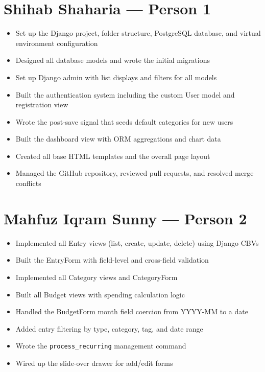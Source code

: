 \documentclass[12pt,a4paper]{report}
\begin{document}
\section{Shihab Shaharia --- Person 1}

\begin{itemize}
  \item Set up the Django project, folder structure, PostgreSQL database, and virtual environment configuration
  \item Designed all database models and wrote the initial migrations
  \item Set up Django admin with list displays and filters for all models
  \item Built the authentication system including the custom User model and registration view
  \item Wrote the post-save signal that seeds default categories for new users
  \item Built the dashboard view with ORM aggregations and chart data
  \item Created all base HTML templates and the overall page layout
  \item Managed the GitHub repository, reviewed pull requests, and resolved merge conflicts
\end{itemize}

\section{Mahfuz Iqram Sunny --- Person 2}

\begin{itemize}
  \item Implemented all Entry views (list, create, update, delete) using Django CBVs
  \item Built the EntryForm with field-level and cross-field validation
  \item Implemented all Category views and CategoryForm
  \item Built all Budget views with spending calculation logic
  \item Handled the BudgetForm month field coercion from YYYY-MM to a date
  \item Added entry filtering by type, category, tag, and date range
  \item Wrote the \texttt{process\_recurring} management command
  \item Wired up the slide-over drawer for add/edit forms
\end{itemize}
\end{document}
